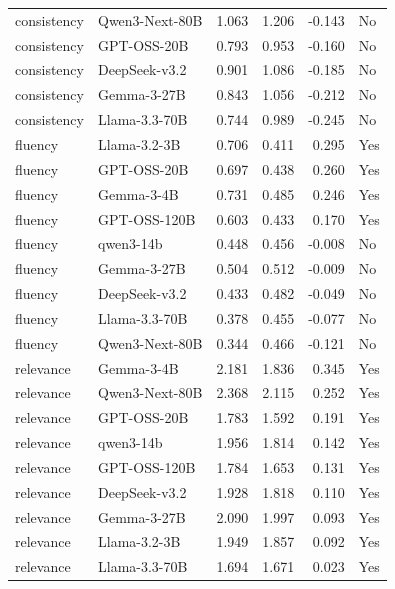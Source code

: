 \begin{table}[t]
{\begin{tabular}{llrrrl}
consistency & Qwen3-Next-80B & 1.063 & 1.206 & -0.143 & No \\
consistency & GPT-OSS-20B & 0.793 & 0.953 & -0.160 & No \\
consistency & DeepSeek-v3.2 & 0.901 & 1.086 & -0.185 & No \\
consistency & Gemma-3-27B & 0.843 & 1.056 & -0.212 & No \\
consistency & Llama-3.3-70B & 0.744 & 0.989 & -0.245 & No \\
fluency & Llama-3.2-3B & 0.706 & 0.411 & 0.295 & Yes \\
fluency & GPT-OSS-20B & 0.697 & 0.438 & 0.260 & Yes \\
fluency & Gemma-3-4B & 0.731 & 0.485 & 0.246 & Yes \\
fluency & GPT-OSS-120B & 0.603 & 0.433 & 0.170 & Yes \\
fluency & qwen3-14b & 0.448 & 0.456 & -0.008 & No \\
fluency & Gemma-3-27B & 0.504 & 0.512 & -0.009 & No \\
fluency & DeepSeek-v3.2 & 0.433 & 0.482 & -0.049 & No \\
fluency & Llama-3.3-70B & 0.378 & 0.455 & -0.077 & No \\
fluency & Qwen3-Next-80B & 0.344 & 0.466 & -0.121 & No \\
relevance & Gemma-3-4B & 2.181 & 1.836 & 0.345 & Yes \\
relevance & Qwen3-Next-80B & 2.368 & 2.115 & 0.252 & Yes \\
relevance & GPT-OSS-20B & 1.783 & 1.592 & 0.191 & Yes \\
relevance & qwen3-14b & 1.956 & 1.814 & 0.142 & Yes \\
relevance & GPT-OSS-120B & 1.784 & 1.653 & 0.131 & Yes \\
relevance & DeepSeek-v3.2 & 1.928 & 1.818 & 0.110 & Yes \\
relevance & Gemma-3-27B & 2.090 & 1.997 & 0.093 & Yes \\
relevance & Llama-3.2-3B & 1.949 & 1.857 & 0.092 & Yes \\
relevance & Llama-3.3-70B & 1.694 & 1.671 & 0.023 & Yes \\
\bottomrule
\end{tabular}
}
\end{table}